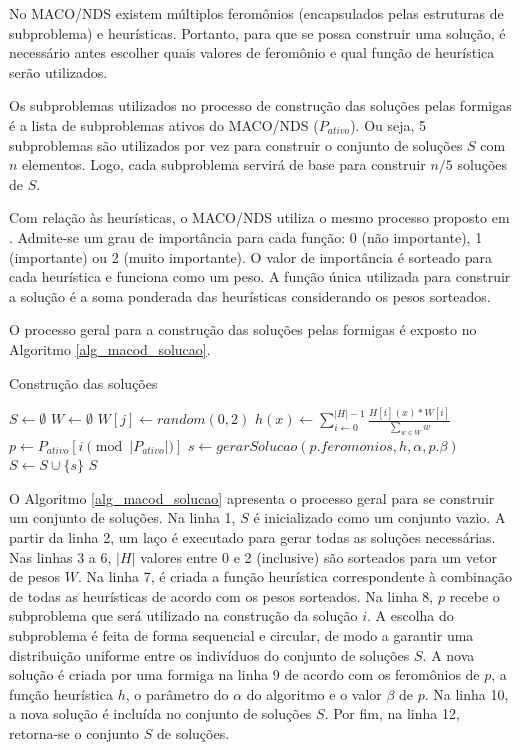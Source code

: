 No MACO/NDS existem múltiplos feromônios (encapsulados pelas estruturas de subproblema) e heurísticas. Portanto, para que se possa construir uma solução, é necessário antes escolher quais valores de feromônio e qual função de heurística serão utilizados. 

Os subproblemas utilizados no processo de construção das soluções pelas formigas é a lista de subproblemas ativos do MACO/NDS ($P_{ativo}$). Ou seja, 5 subproblemas são utilizados por vez para construir o conjunto de soluções $S$ com $n$ elementos. Logo, cada subproblema servirá de base para construir $n/5$ soluções de $S$.

Com relação às heurísticas, o MACO/NDS utiliza o mesmo processo proposto em \cite{Riveros2016}. Admite-se um grau de importância para cada função: 0 (não importante), 1 (importante) ou 2 (muito importante). O valor de importância é sorteado para cada heurística e funciona como um peso. A função única utilizada para construir a solução é a soma ponderada das heurísticas considerando os pesos sorteados.

O processo geral para a construção das soluções pelas formigas é exposto no Algoritmo \ref{alg_macod_solucao}.

\begin{algorithm}
	\caption{Construção das soluções}
	\label{alg_macod_solucao}
	\begin{algorithmic}[1]
		\State $S \gets \emptyset$
		\State $W \gets \emptyset$
		\State $W[j] \gets random(0,2)$
		\EndFor
		\State $h(x) \gets \sum_{i \gets 0}^{|H|-1}\frac{H[i](x) * W[i]}{\sum\limits_{w \in W}w}$
		\State $p \gets P_{ativo}[i \pmod{|P_{ativo}|}]$
		\State $s \gets gerarSolucao(p.feromonios, h, \alpha, p.\beta)$
		\State $S \gets S \cup \{s\}$
		\EndFor
		\State \Return $S$
	\end{algorithmic}
\end{algorithm}

O Algoritmo \ref{alg_macod_solucao} apresenta o processo geral para se construir um conjunto de soluções. Na linha 1, $S$ é inicializado como um conjunto vazio. A partir da linha 2, um laço é executado para gerar todas as soluções necessárias. Nas linhas 3 a 6, $|H|$ valores entre 0 e 2 (inclusive) são sorteados para um vetor de pesos $W$. Na linha 7, é criada a função heurística correspondente à combinação de todas as heurísticas de acordo com os pesos sorteados. Na linha 8, $p$ recebe o subproblema que será utilizado na construção da solução $i$. A escolha do subproblema é feita de forma sequencial e circular, de modo a garantir uma distribuição uniforme entre os indivíduos do conjunto de soluções $S$. A nova solução é criada por uma formiga na linha 9 de acordo com os feromônios de $p$, a função heurística $h$, o parâmetro do $\alpha$ do algoritmo e o valor $\beta$ de $p$. Na linha 10, a nova solução é incluída no conjunto de soluções $S$. Por fim, na linha 12, retorna-se o conjunto $S$ de soluções.

